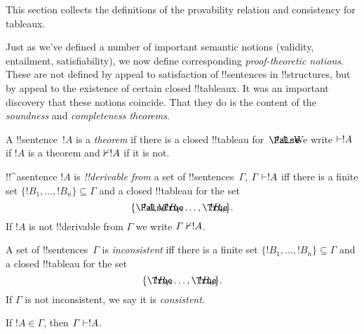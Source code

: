 \documentclass[../../../include/open-logic-section]{subfiles}
\begin{document}
      {}
      {}
      

\begin{editorial}
This section collects the definitions of the provability relation
and consistency for tableaux.
\end{editorial}

\begin{explain}
Just as we've defined a number of important semantic notions
(validity, entailment, satisfiability), we now define corresponding
\emph{proof-theoretic notions}.  These are not defined by appeal to
satisfaction of !!{sentence}s in !!{structure}s, but by appeal to the
existence of certain closed !!{tableau}x.  It was an important
discovery that these notions coincide.  That they do is the content of
the \emph{soundness} and \emph{completeness theorems}.
\end{explain}


\begin{defn}[Theorems]
A !!{sentence}~$!A$ is a \emph{theorem} if there is a closed
!!{tableau} for~$\sFmla{\False}{!A}$.  We write $\Proves !A$ if $!A$
is a theorem and $\Proves/ !A$ if it is not.
\end{defn}

\begin{defn}[!!^{derivability}]
!!^a{sentence} $!A$ is \emph{!!{derivable} from} a set of
!!{sentence}s~$\Gamma$, $\Gamma \Proves !A$ iff there is a
finite set $\{!B_1, \dots, !B_n\} \subseteq \Gamma$
and a closed !!{tableau} for the set
\[
\{
  \sFmla{\False}{!A},
  \sFmla{\True}{!B_1}, \dots,
  \sFmla{\True}{!B_n}
  \}.
\]
If $!A$ is not !!{derivable} from $\Gamma$ we write $\Gamma \Proves/
!A$.
\end{defn}

\begin{defn}[Consistency]
A set of !!{sentence}s~$\Gamma$ is \emph{inconsistent} iff there is a
finite set $\{!B_1, \dots, !B_n\} \subseteq \Gamma$ and a closed
!!{tableau} for the set
\[
\{
  \sFmla{\True}{!B_1}, \dots,
  \sFmla{\True}{!B_n}  
  \}.
\]
If $\Gamma$ is not inconsistent, we say it is \emph{consistent}.
\end{defn}

\begin{prop}[Reflexivity]
If $!A \in \Gamma$, then $\Gamma \Proves !A$.
\end{prop}
\end{document}
